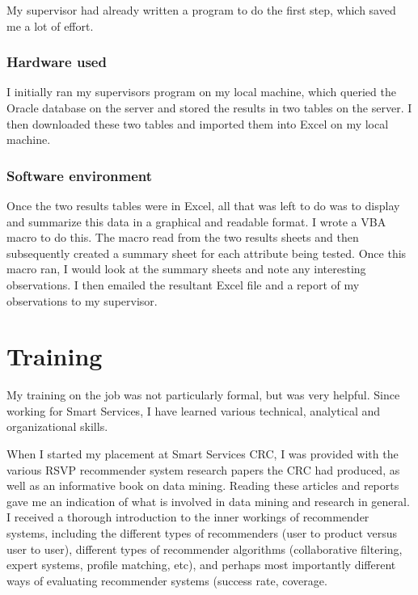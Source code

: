 \documentclass{report}
\begin{document}
My supervisor had already written a program to do the first step, which saved me a lot of effort.

\subsection{Hardware used}
I initially ran my supervisors program on my local machine, which queried the Oracle database on the server and stored the results in two tables on the server. I then downloaded these two tables and imported them into Excel on my local machine.

\subsection{Software environment}
Once the two results tables were in Excel, all that was left to do was to display and summarize this data in a graphical and readable format. I wrote a VBA macro to do this. The macro read from the two results sheets and then subsequently created a summary sheet for each attribute being tested. Once this macro ran, I would look at the summary sheets and note any interesting observations. I then emailed the resultant Excel file and a report of my observations to my supervisor.


\chapter{Training}
My training on the job was not particularly formal, but was very helpful. Since working for Smart Services, I have learned various technical, analytical and organizational skills.

When I started my placement at Smart Services CRC, I was provided with the various RSVP recommender system research papers the CRC had produced, as well as an informative book on data mining. Reading these articles and reports gave me an indication of what is involved in data mining and research in general. I received a thorough introduction to the inner workings of recommender systems, including the different types of recommenders (user to product versus user to user), different types of recommender algorithms (collaborative filtering, expert systems, profile matching, etc), and perhaps most importantly different ways of evaluating recommender systems (success rate, coverage.
\end{document}
